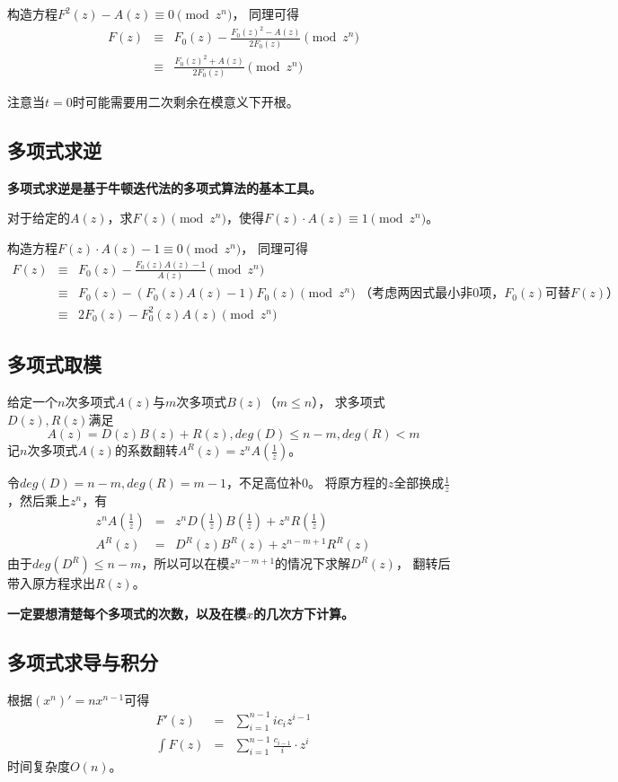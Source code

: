 构造方程$F^2(z)-A(z)\equiv 0\pmod{z^n}$，
同理可得
\begin{eqnarray*}
    F(z)&\equiv& F_0(z)-\frac{F_0(z)^2-A(z)}{2F_0(z)} \pmod{z^n}\\
    &\equiv& \frac{F_0(z)^2+A(z)}{2F_0(z)} \pmod{z^n}
\end{eqnarray*}

注意当$t=0$时可能需要用二次剩余在模意义下开根。

\subsection{多项式求逆}
{\bfseries 多项式求逆是基于牛顿迭代法的多项式算法的基本工具。}

对于给定的$A(z)$，求$F(z) \pmod{z^n}$，使得$F(z)\cdot A(z)\equiv 1\pmod{z^n}$。

构造方程$F(z)\cdot A(z)-1\equiv 0\pmod{z^n}$，
同理可得
\begin{eqnarray*}
    F(z)&\equiv& F_0(z)-\frac{F_0(z)A(z)-1}{A(z)} \pmod{z^n}\\
    &\equiv& F_0(z)-(F_0(z) A(z)-1){F_0(z)} \pmod{z^n}
    \textrm{~（考虑两因式最小非0项，$F_0(z)$可替$F(z)$）}\\
    &\equiv& 2F_0(z)-F_0^2(z)A(z) \pmod{z^n}
\end{eqnarray*}
\subsection{多项式取模}
给定一个$n$次多项式$A(z)$与$m$次多项式$B(z)$（$m\leq n$），
求多项式$D(z),R(z)$满足
\begin{displaymath}
    A(z)=D(z)B(z)+R(z),deg(D)\leq n-m,deg(R)<m
\end{displaymath}
记$n$次多项式$A(z)$的系数翻转$A^R(z)=z^nA(\frac{1}{z})$。

令$deg(D)=n-m,deg(R)=m-1$，不足高位补0。
将原方程的$z$全部换成$\frac{1}{z}$，然后乘上$z^n$，有
\begin{eqnarray*}
    z^nA(\frac{1}{z})&=&z^nD(\frac{1}{z})B(\frac{1}{z})+z^nR(\frac{1}{z})\\
    A^R(z)&=&D^R(z)B^R(z)+z^{n-m+1}R^R(z)
\end{eqnarray*}
由于$deg(D^R)\leq n-m$，所以可以在模$z^{n-m+1}$的情况下求解$D^R(z)$，
翻转后带入原方程求出$R(z)$。

{\bfseries 一定要想清楚每个多项式的次数，以及在模$x$的几次方下计算。}
\subsection{多项式求导与积分}
根据$(x^n)'=nx^{n-1}$可得
\begin{eqnarray*}
    F'(z)&=&\sum_{i=1}^{n-1}{ic_iz^{i-1}}\\
    \int F(z)&=&\sum_{i=1}^{n-1}{\frac{c_{i-1}}{i}\cdot z^i}
\end{eqnarray*}
时间复杂度$O(n)$。
